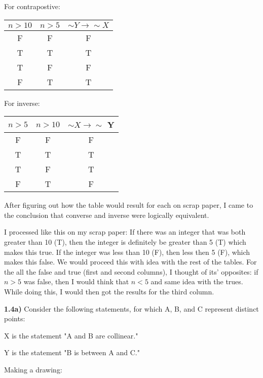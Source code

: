 \documentclass{article}
\begin{document}
For contrapostive: 

\begin{center}
\begin{tabular}{| c | c | c |}

$n >10$ & $n>5$ & $\sim Y \rightarrow \sim X$ \\
\hline
F & F & F \\
T & T & T \\
T & F & F \\
F & T & T
\end{tabular}
\end{center}

\vspace{3mm} 

For inverse: 
\begin{center}
\begin{tabular}{| c | c | c |}

$n >5$ & $n>10$ & $\sim X \rightarrow \sim $ Y \\
\hline
F & F & F \\
T & T & T \\
T & F & T \\
F & T & F
\end{tabular}
\end{center}
\vspace{3mm}
After figuring out how the table would result for each on scrap paper, I came to the conclusion that converse and inverse were logically equivalent. 

I processed like this on my scrap paper: If there was an integer that was both greater than 10 (T), then the integer is definitely be greater than 5 (T) which makes this true. If the integer was less than 10 (F), then less then 5 (F), which makes this false. We would proceed this with idea with the rest of the tables. For the all the false and true (first and second columns), I thought of its' opposites: if $n>5$ was false, then I would think that $n<5$ and same idea with the trues. While doing this, I would then got the results for the third column. 

\newpage
\textbf{1.4a)} Consider the following statements, for which A, B, and C represent distinct points: 

\vspace{3mm}

X is the statement "A and B are collinear."

Y is the statement "B is between A and C."
\vspace{3mm}

Making a drawing:
\end{document}
